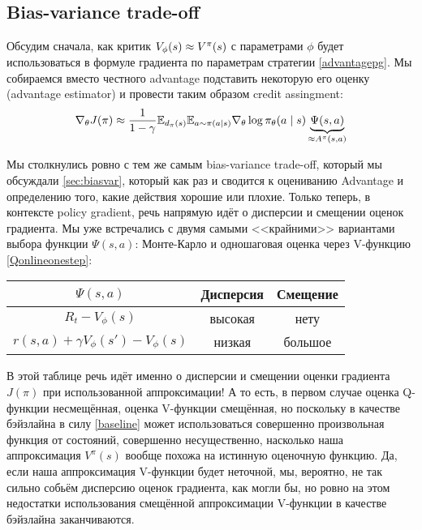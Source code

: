\subsection{Bias-variance trade-off}

Обсудим сначала, как критик $V_{\phi}(s) \HM\approx V^\pi(s)$ с параметрами $\phi$ будет использоваться в формуле градиента по параметрам стратегии \eqref{advantagepg}. Мы собираемся вместо честного advantage подставить некоторую его оценку (advantage estimator) и провести таким образом credit assingment:
\begin{equation}\label{advantageestimation}
\nabla_{\theta} J(\pi) \approx \frac{1}{1 - \gamma}\mathbb{E}_{d_\pi(s)} \mathbb{E}_{a \sim \pi(a \mid s)} \nabla_{\theta} \log \pi_\theta (a \mid s) \underbrace{\Psi (s, a)}_{\approx A^{\pi}(s, a)}
\end{equation}

Мы столкнулись ровно с тем же самым bias-variance trade-off, который мы обсуждали \ref{sec:biasvar}, который как раз и сводится к оцениванию Advantage и определению того, какие действия хорошие или плохие. Только теперь, в контексте policy gradient, речь напрямую идёт о дисперсии и смещении оценок градиента. Мы уже встречались с двумя самыми <<крайними>> вариантами выбора функции $\Psi (s, a)$: Монте-Карло и одношаговая оценка через V-функцию \eqref{Qonlineonestep}:

\vspace{0.2cm}
\begin{center}
\begin{tabular}{ccc}
\toprule
    \textbf{$\Psi (s, a)$} & \textbf{Дисперсия} & \textbf{Смещение}  \\
\midrule
    $R_t - V_{\phi}(s)$ & высокая & нету \\
    \hdashline
    $r(s, a) + \gamma V_{\phi}(s') - V_{\phi}(s)$ & низкая & большое \\
\bottomrule
\end{tabular}
\end{center}
\vspace{0.2cm}

В этой таблице речь идёт именно о дисперсии и смещении оценки градиента $J(\pi)$ при использованной аппроксимации! А то есть, в первом случае оценка Q-функции несмещённая, оценка V-функции смещённая, но поскольку в качестве бэйзлайна в силу \eqref{baseline} может использоваться совершенно произвольная функция от состояний, совершенно несущественно, насколько наша аппроксимация $V^\pi(s)$ вообще похожа на истинную оценочную функцию. Да, если наша аппроксимация V-функции будет неточной, мы, вероятно, не так сильно собьём дисперсию оценок градиента, как могли бы, но ровно на этом недостатки использования смещённой аппроксимации V-функции в качестве бэйзлайна заканчиваются. 

